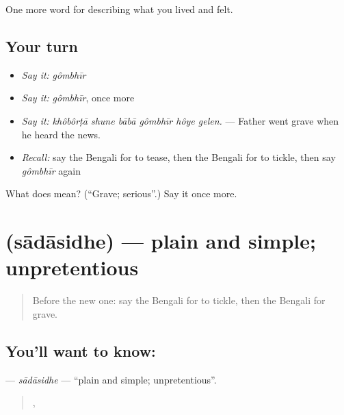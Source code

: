 \begin{grammarlens}[title={What you've built}]
One more word for describing what you lived and felt.
\end{grammarlens}

\subsection*{Your turn}
\begin{itemize}
\raggedright
  \item \emph{Say it:} \emph{gômbhīr}
  \item \emph{Say it:} \emph{gômbhīr}, once more
  \item \emph{Say it:} \emph{khôbôrṭā shune bābā gômbhīr hôye gelen.} — Father went grave when he heard the news.
  \item \emph{Recall:} say the Bengali for to tease, then the Bengali for to tickle, then say \emph{gômbhīr} again
\end{itemize}

\begin{tcolorbox}[breakable,colback=teal!4,colframe=teal!35!black,title={Before you move on}]
What does  mean? (\textquotedblleft{}Grave; serious\textquotedblright{}.) Say it once more.
\end{tcolorbox}
\section[\texorpdfstring{\bn{সাদাসিধে} (sādāsidhe)}{সাদাসিধে (sādāsidhe)}]{ (sādāsidhe) — plain and simple; unpretentious}

\label{lesson:BN-C464-sadasidhe}



\begin{quote}
Before the new one: say the Bengali for to tickle, then the Bengali for grave.
\end{quote}

\subsection*{You'll want to know: }
\textbf{} — \emph{sādāsidhe} — \textquotedblleft{}plain and simple; unpretentious\textquotedblright{}.

\begin{quote}
  ,     
\end{quote}

